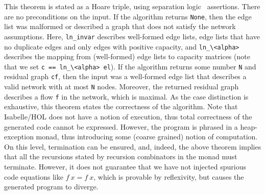 \documentclass[smallcondensed]{svjour3}     %
\newcommand{\isai}{\lstinline[language=isabelle,basicstyle=\normalsize\ttfamily\slshape]}
\begin{document}
  \noindent This theorem is stated as a Hoare triple, using separation logic~\cite{Rey02,LaMe12} assertions. There are no preconditions on the input.
  If the algorithm returns \isai{None}, then the edge list was malformed or described a graph that does not satisfy the network assumptions.
  Here, \isai{ln_invar} describes well-formed edge lists, \ie edge lists that have no duplicate edges and only edges with positive capacity,
  and \isai{ln_\<alpha>} describes the mapping from (well-formed) edge lists to capacity matrices (note that we set \isai{c == ln_\<alpha> el}).
  If the algorithm returns some number \isai{N} and residual graph \isai{cf}, then the input was a well-formed edge list that describes a valid network with at most \isai{N} nodes.
  Moreover, the returned residual graph describes a flow \isai{f} in the network, which is maximal. 
  As the case distinction is exhaustive, this theorem states the correctness of the algorithm. 
  Note that Isabelle/HOL does not have a notion of execution, thus total correctness of the generated code cannot be expressed. However, the program is phrased in a heap-exception monad, thus introducing some (coarse grained) notion of
  computation. On this level, termination can be ensured, and, indeed, the above theorem implies that all the recursions stated by recursion 
  combinators in the monad must terminate. However, it does not guarantee that we have not injected spurious code equations like $f~x = f~x$, 
  which is provable by reflexivity, but causes the generated program to diverge.
\end{document}
